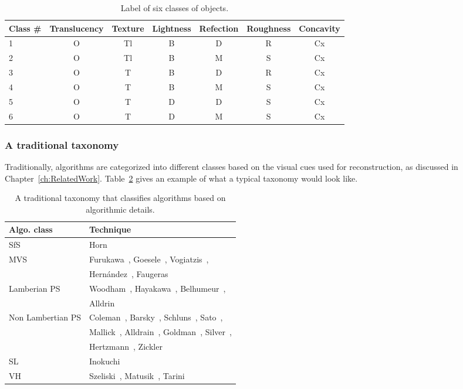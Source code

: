 \begin{table}[!htbp]
\centering
\begin{tabular}{l|*{6}{c}}
\toprule
Class \# & Translucency & Texture & Lightness & Refection & Roughness & Concavity\\
\midrule
1 & O & Tl & B & D & R & Cx\\
2 & O & Tl & B & M & S & Cx\\
3 & O & T & B & D & R & Cx\\
4 & O & T & B & M & S & Cx\\
5 & O & T & D & D & S & Cx\\
6 & O & T & D & M & S & Cx\\
\bottomrule
\end{tabular}
\caption{Label of six classes of objects.}
\label{tab:six_obj_class}
\end{table}

\subsubsection{A traditional taxonomy}
Traditionally, algorithms are categorized into different classes based on the visual cues used for reconstruction, as discussed in Chapter~\ref{ch:RelatedWork}. 
Table~\ref{tab:class_algo} gives an example of what a typical taxonomy would look like.
\begin{table}[!htbp]
  \centering
  \begin{tabular}{l|l}
  \toprule
  \textbf{Algo. class} & \textbf{Technique}\\
  \midrule
  SfS & Horn~\cite{horn1970shape}\\
  MVS & Furukawa~\cite{furukawa2010accurate}, Goesele~\cite{goesele2006multi}, Vogiatzis~\cite{vogiatzis2007multiview}, \\
      & Hern{\'a}ndez~\cite{esteban2004silhouette}, Faugeras~\cite{faugeras2002variational}\\
  Lamberian PS & Woodham~\cite{woodham1980photometric}, Hayakawa~\cite{hayakawa1994photometric}, Belhumeur~\cite{belhumeur1999bas}, \\
      & Alldrin~\cite{alldrin2007resolving}\\
  Non Lambertian PS & Coleman~\cite{coleman1982obtaining}, Barsky~\cite{barsky20034}, Schluns~\cite{schluns1993photometric}, Sato~\cite{sato1994temporal}, \\
      & Mallick~\cite{mallick2005beyond}, Alldrain~\cite{alldrin2008photometric}, Goldman~\cite{goldman2010shape}, Silver~\cite{silver1980determining}, \\
      & Hertzmann~\cite{hertzmann2005example}, Zickler~\cite{zickler2002helmholtz}\\
  SL & Inokuchi~\cite{inokuchi1984range}\\
  VH & Szeliski~\cite{szeliski1993rapid}, Matusik~\cite{matusik2002efficient}, Tarini~\cite{tarini2002marching}\\
  \bottomrule
  \end{tabular}
  \caption{A traditional taxonomy that classifies algorithms based on algorithmic details.}
  \label{tab:class_algo}
\end{table}

